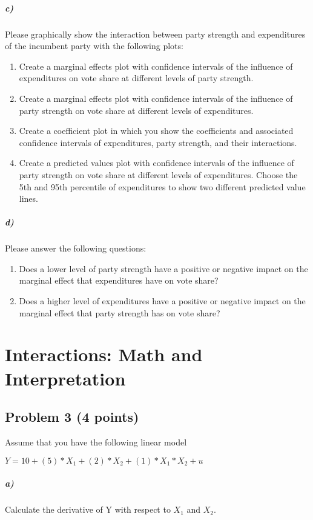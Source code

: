 \documentclass[12pt]{article}
\begin{document}
\subparagraph{c)} Please graphically show the interaction between party strength and expenditures of the incumbent party with the following plots:

\begin{enumerate}
	\item Create a marginal effects plot with confidence intervals of the influence of expenditures on vote share at different levels of party strength.
	\item Create a marginal effects plot with confidence intervals of the influence of party strength on vote share at different levels of expenditures.
	\item Create a coefficient plot in which you show the coefficients and associated confidence intervals of expenditures, party strength, and their interactions.
	\item Create a predicted values plot with confidence intervals of the influence of party strength on vote share at different levels of expenditures. Choose the 5th and 95th percentile of expenditures to show two different predicted value lines.
\end{enumerate}

\subparagraph{d)} Please answer the following questions:

\begin{enumerate}
	\item Does a lower level of party strength have a positive or negative impact on the marginal effect that expenditures have on vote share?
	\item Does a higher level of expenditures have a positive or negative impact on the marginal effect that party strength has on vote share?
\end{enumerate}



\section*{Interactions: Math and Interpretation}

\subsection*{Problem 3 (4 points)}

Assume that you have the following linear model

$Y = 10 + (5) * X_1 + (2) * X_2 + (1) * X_1 * X_2 + u$

\subparagraph{a)} Calculate the derivative of Y with respect to $X_1$ and $X_2$.
\end{document}
